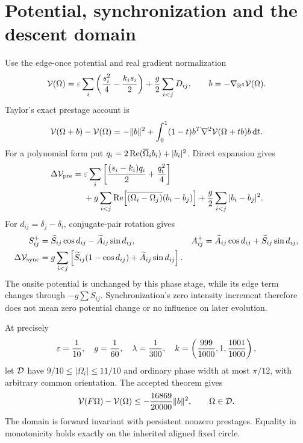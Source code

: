 \section{Potential, synchronization and the descent domain}
Use the edge-once potential and real gradient normalization
\begin{equation}\label{eq:potential}
 \mathcal V(\Omega)=\varepsilon\sum_i\left(\frac{s_i^2}{4}-\frac{k_i s_i}{2}\right)
       +\frac g2\sum_{i<j}D_{ij},\qquad b=-\nabla_{\mathbb R^6}\mathcal V(\Omega).
\end{equation}
Taylor's exact prestage account is
\begin{equation}\label{eq:taylor}
 \mathcal V(\Omega+b)-\mathcal V(\Omega)=-\|b\|^2+
 \int_0^1(1-t)b^T\nabla^2\mathcal V(\Omega+tb)b\,\mathrm d t.
\end{equation}
For a polynomial form put $q_i=2\operatorname{Re}(\overline\Omega_i b_i)+|b_i|^2$. Direct expansion gives
\begin{align}
 \Delta\mathcal V_{\rm pre}={}&\varepsilon\sum_i\left[\frac{(s_i-k_i)q_i}{2}+\frac{q_i^2}{4}\right]\notag\\
 &+g\sum_{i<j}\operatorname{Re}\!\left[\overline{(\Omega_i-\Omega_j)}(b_i-b_j)\right]
       +\frac g2\sum_{i<j}|b_i-b_j|^2.\label{eq:poly}
\end{align}
For $d_{ij}=\delta_j-\delta_i$, conjugate-pair rotation gives
\begin{align}
 S_{ij}^+&=\widetilde S_{ij}\cos d_{ij}-\widetilde A_{ij}\sin d_{ij},&
 A_{ij}^+&=\widetilde A_{ij}\cos d_{ij}+\widetilde S_{ij}\sin d_{ij},\label{eq:rotation}\\
 \Delta\mathcal V_{\rm sync}&=g\sum_{i<j}\left[\widetilde S_{ij}(1-\cos d_{ij})+
                  \widetilde A_{ij}\sin d_{ij}\right].\label{eq:sync}
\end{align}
The onsite potential is unchanged by this phase stage, while its edge term changes through $-g\sum S_{ij}$. Synchronization's zero intensity increment therefore does not mean zero potential change or no influence on later evolution.

\begin{theorem}\label{thm:descent}
At precisely
\begin{equation}\label{eq:tuple}
 \varepsilon=\frac1{10},\quad g=\frac1{60},\quad\lambda=\frac1{300},\quad
 k=\left(\frac{999}{1000},1,\frac{1001}{1000}\right),
\end{equation}
let $\mathcal D$ have $9/10\le|\Omega_i|\le11/10$ and ordinary phase width at most $\pi/12$, with arbitrary common orientation. The accepted theorem \cite[finite-domain descent]{potential} gives
\begin{equation}\label{eq:descent}
 \mathcal V(F\Omega)-\mathcal V(\Omega)\le-\frac{16869}{20000}\|b\|^2,\qquad\Omega\in\mathcal D.
\end{equation}
The domain is forward invariant with persistent nonzero prestages. Equality in monotonicity holds exactly on the inherited aligned fixed circle.
\end{theorem}

